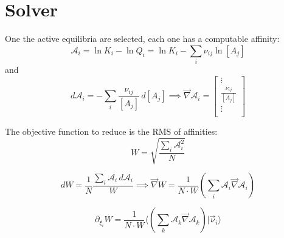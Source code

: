 \documentclass[aps,12pt]{revtex4}
\begin{document}
\section{Solver}

One the active equilibria are selected, each one has a computable 
affinity:
\begin{equation}
\label{eq:affinity}
	\mathcal A_i = \ln K_i - \ln Q_i = \ln K_i -  \sum_{i} \nu_{ij} \ln [A_j] %
\end{equation}
and
\begin{equation}
	d \mathcal A_i = - \sum_i \dfrac{\nu_{ij}}{[A_j]} \, d[A_j] \implies
	 \vec \nabla \mathcal A_i = 
	\begin{bmatrix}
	\vdots\\
	\frac{\nu_{ij}}{[A_j]}\\
	\vdots\\
	\end{bmatrix}
\end{equation}

The objective function to reduce is the RMS of affinities:
\begin{equation}
	W = \sqrt{ \dfrac{\sum_i \mathcal A_i^2}{N} } 
\end{equation}

\begin{equation}
	dW = \dfrac{1}{N} \dfrac{\sum_i \mathcal A_i \, d \mathcal A_i}{W}
	\implies
	\vec \nabla W = \dfrac{1}{N\cdot W} \left( \sum_i \mathcal A_i \vec \nabla \mathcal A_i \right)
\end{equation}

\begin{equation}
\partial_{\xi_i} W = \dfrac{1}{N\cdot W} \langle \left( \sum_k \mathcal A_k \vec \nabla \mathcal A_k \right) \vert \vec \nu_i \rangle
\end{equation}
\end{document}
